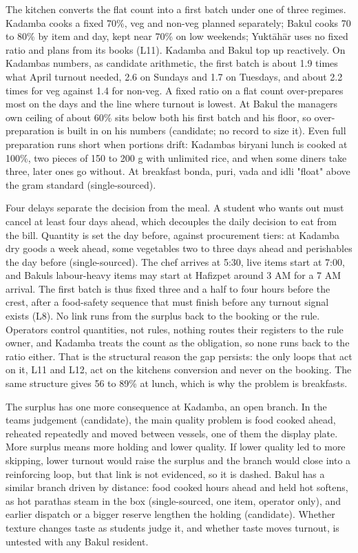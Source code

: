 \documentclass[
  10pt,
  table]{article}
\newcounter{none} %
\begin{document}
The kitchen converts the flat count into a first batch under one of three regimes. Kadamba cooks a fixed 70\%, veg and non-veg planned separately; Bakul cooks 70 to 80\% by item and day, kept near 70\% on low weekends; Yuktāhār uses no fixed ratio and plans from its books (L11). Kadamba and Bakul top up reactively. On Kadamba\textquotesingle s numbers, as candidate arithmetic, the first batch is about 1.9 times what April turnout needed, 2.6 on Sundays and 1.7 on Tuesdays, and about 2.2 times for veg against 1.4 for non-veg. A fixed ratio on a flat count over-prepares most on the days and the line where turnout is lowest. At Bakul the manager\textquotesingle s own ceiling of about 60\% sits below both his first batch and his floor, so over-preparation is built in on his numbers (candidate; no record to size it). Even full preparation runs short when portions drift: Kadamba\textquotesingle s biryani lunch is cooked at 100\%, two pieces of 150 to 200 g with unlimited rice, and when some diners take three, later ones go without. At breakfast bonda, puri, vada and idli "float" above the gram standard (single-sourced).

Four delays separate the decision from the meal. A student who wants out must cancel at least four days ahead, which decouples the daily decision to eat from the bill. Quantity is set the day before, against procurement tiers: at Kadamba dry goods a week ahead, some vegetables two to three days ahead and perishables the day before (single-sourced). The chef arrives at 5:30, live items start at 7:00, and Bakul\textquotesingle s labour-heavy items may start at Hafizpet around 3 AM for a 7 AM arrival. The first batch is thus fixed three and a half to four hours before the crest, after a food-safety sequence that must finish before any turnout signal exists (L8). No link runs from the surplus back to the booking or the rule. Operators control quantities, not rules, nothing routes their registers to the rule owner, and Kadamba treats the count as the obligation, so none runs back to the ratio either. That is the structural reason the gap persists: the only loops that act on it, L11 and L12, act on the kitchen\textquotesingle s conversion and never on the booking. The same structure gives 56 to 89\% at lunch, which is why the problem is breakfast\textquotesingle s.

The surplus has one more consequence at Kadamba, an open branch. In the team\textquotesingle s judgement (candidate), the main quality problem is food cooked ahead, reheated repeatedly and moved between vessels, one of them the display plate. More surplus means more holding and lower quality. If lower quality led to more skipping, lower turnout would raise the surplus and the branch would close into a reinforcing loop, but that link is not evidenced, so it is dashed. Bakul has a similar branch driven by distance: food cooked hours ahead and held hot softens, as hot parathas steam in the box (single-sourced, one item, operator only), and earlier dispatch or a bigger reserve lengthen the holding (candidate). Whether texture changes taste as students judge it, and whether taste moves turnout, is untested with any Bakul resident.
\end{document}

